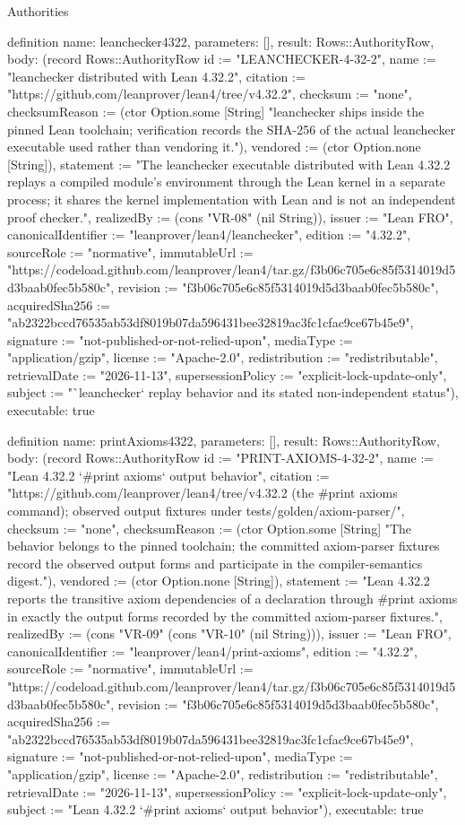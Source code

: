 \begin{lexlean}{Authorities}
\begin{semanticmodule}
definition{
  name: leanchecker4322,
  parameters: [],
  result: Rows::AuthorityRow,
  body: (record Rows::AuthorityRow {id := "LEANCHECKER-4-32-2", name := "leanchecker distributed with Lean 4.32.2", citation := "https://github.com/leanprover/lean4/tree/v4.32.2", checksum := "none", checksumReason := (ctor Option.some [String] "leanchecker ships inside the pinned Lean toolchain; verification records the SHA-256 of the actual leanchecker executable used rather than vendoring it."), vendored := (ctor Option.none [String]), statement := "The leanchecker executable distributed with Lean 4.32.2 replays a compiled module's environment through the Lean kernel in a separate process; it shares the kernel implementation with Lean and is not an independent proof checker.", realizedBy := (cons "VR-08" (nil String)), issuer := "Lean FRO", canonicalIdentifier := "leanprover/lean4/leanchecker", edition := "4.32.2", sourceRole := "normative", immutableUrl := "https://codeload.github.com/leanprover/lean4/tar.gz/f3b06c705e6c85f5314019d5d3baab0fec5b580c", revision := "f3b06c705e6c85f5314019d5d3baab0fec5b580c", acquiredSha256 := "ab2322bccd76535ab53df8019b07da596431bee32819ac3fc1cfac9ce67b45e9", signature := "not-published-or-not-relied-upon", mediaType := "application/gzip", license := "Apache-2.0", redistribution := "redistributable", retrievalDate := "2026-11-13", supersessionPolicy := "explicit-lock-update-only", subject := "`leanchecker` replay behavior and its stated non-independent status"}),
  executable: true
}

definition{
  name: printAxioms4322,
  parameters: [],
  result: Rows::AuthorityRow,
  body: (record Rows::AuthorityRow {id := "PRINT-AXIOMS-4-32-2", name := "Lean 4.32.2 `#print axioms` output behavior", citation := "https://github.com/leanprover/lean4/tree/v4.32.2 (the #print axioms command); observed output fixtures under tests/golden/axiom-parser/", checksum := "none", checksumReason := (ctor Option.some [String] "The behavior belongs to the pinned toolchain; the committed axiom-parser fixtures record the observed output forms and participate in the compiler-semantics digest."), vendored := (ctor Option.none [String]), statement := "Lean 4.32.2 reports the transitive axiom dependencies of a declaration through #print axioms in exactly the output forms recorded by the committed axiom-parser fixtures.", realizedBy := (cons "VR-09" (cons "VR-10" (nil String))), issuer := "Lean FRO", canonicalIdentifier := "leanprover/lean4/print-axioms", edition := "4.32.2", sourceRole := "normative", immutableUrl := "https://codeload.github.com/leanprover/lean4/tar.gz/f3b06c705e6c85f5314019d5d3baab0fec5b580c", revision := "f3b06c705e6c85f5314019d5d3baab0fec5b580c", acquiredSha256 := "ab2322bccd76535ab53df8019b07da596431bee32819ac3fc1cfac9ce67b45e9", signature := "not-published-or-not-relied-upon", mediaType := "application/gzip", license := "Apache-2.0", redistribution := "redistributable", retrievalDate := "2026-11-13", supersessionPolicy := "explicit-lock-update-only", subject := "Lean 4.32.2 `#print axioms` output behavior"}),
  executable: true
}


\end{semanticmodule}
\end{lexlean}
